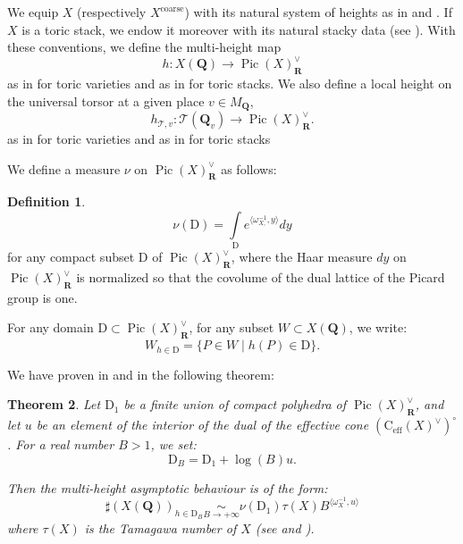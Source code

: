 \documentclass{proc-l}
\newcommand{\R}{\mathbf{R}}
\newcommand{\Q}{\mathbf{Q}}
\newcommand{\cone}{\text{C}_{\text{eff}}(X)}
\DeclareMathOperator{\Pic}{Pic}
\DeclareMathOperator{\coarse}{coarse}
\newcommand{\stackT}{\mathcal{T}}
\newcommand{\w}{\omega}
\newtheorem{theorem}{Theorem}[section]
\theoremstyle{definition}
\newtheorem{definition}[theorem]{Definition}
\theoremstyle{remark}
\numberwithin{equation}{section}
\begin{document}
We equip $X$ (respectively $X^{\coarse}$) with its natural system of heights as in \cite[Definition 9.2]{salberger_torsor} and \cite[Proposition 2.1.2]{Batyrev1990}. If $X$ is a toric stack, we endow it moreover with its natural stacky data (see \cite[Definition 3.25 and Section 6]{bongiorno_toric_stacks}). With these conventions, we define the multi-height map $$h : X(\Q) \rightarrow \Pic(X)^{\vee}_{\R}$$ as in \cite[Definition 2.7]{bongiorno2024multiheightanalysisrationalpoints} for toric varieties and as in \cite[Definition 3.26]{bongiorno_toric_stacks} for toric stacks. We also define a local height on the universal torsor at a given place $v \in M_{\Q}$,
$$
h_{\stackT,v} : \stackT(\Q_v) \longrightarrow \Pic(X)^{\vee}_{\R}.
$$
as in \cite[Definition 3.6]{bongiorno2024multiheightanalysisrationalpoints} for toric varieties and as in \cite[Definition 6.20]{bongiorno_toric_stacks} for toric stacks 



We define a measure $\nu$ on $\Pic(X)^{\vee}_{\R}$ as follows:

\begin{definition}\label{mesure_picard_group}
    $$ \nu(\mathrm{D}) = \int\limits_{\mathrm{D}} e^{\langle \w_{X,}^{-1},y \rangle} dy $$for any compact subset $\mathrm{D}$ of $\Pic(X)^{\vee}_{\R}$, where the Haar measure $dy$ on $\Pic(X)^{\vee}_{\R}$ is normalized so that the covolume of the dual lattice of the Picard group is one.
\end{definition}

For any domain $\mathrm{D} \subset \Pic(X)^{\vee}_{\R}$, for any subset $W \subset X(\Q)$, we write:
$$ W_{h \in \mathrm{D}} = \{ P \in W \mid h(P) \in \mathrm{D} \} .$$

We have proven in \cite[Theorem 4.16]{bongiorno2024multiheightanalysisrationalpoints} and in \cite[Theorem 7.16]{bongiorno_toric_stacks} the following theorem:

\begin{theorem}\label{theorem_multi_height}
Let $\mathrm{D}_1$ be a finite union of compact polyhedra of $\Pic(X)^{\vee}_{\R}$,
and let $u$ be an element of the interior of the dual of the effective cone
$(\cone^{\vee})^{\circ}$.
For a real number $B > 1$, we set:
$$ \mathrm{D}_B = \mathrm{D}_1 + \log(B) u .$$
 
Then the multi-height asymptotic behaviour is of the form:
$$ \sharp ( X(\Q) )_{h \in \mathrm{D}_B} \underset{B \rightarrow +\infty}{\sim} \nu(\mathrm{D}_1 ) \tau(X) B^{\langle \w_{X}^{-1},u \rangle}$$ where $\tau(X)$ is the Tamagawa number of $X$ (see \cite[Definition 3.22]{bongiorno2024multiheightanalysisrationalpoints} and \cite[Definition 6.51]{bongiorno_toric_stacks}).

\end{theorem}
\end{document}
